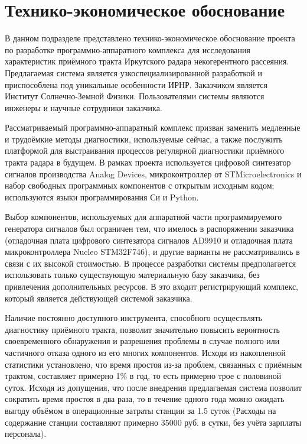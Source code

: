 \documentclass{report}
\begin{document}
\section{Технико-экономическое обоснование}

В данном подразделе представлено технико-экономическое обоснование проекта по разработке программно-аппаратного комплекса для исследования характеристик приёмного тракта Иркутского радара некогерентного рассеяния. Предлагаемая система является узкоспециализированной разработкой и приспособлена под уникальные особенности ИРНР. Заказчиком является Институт Солнечно-Земной Физики. Пользователями системы являются инженеры и научные сотрудники заказчика.

Рассматриваемый программно-аппаратный комплекс призван заменить медленные и трудоёмкие методы диагностики, используемые сейчас, а также послужить платформой для выстраивания процессов регулярной диагностики приёмного тракта радара в будущем. В рамках проекта используется цифровой синтезатор сигналов производства Analog Devices, микроконтроллер от STMicroelectronics и набор свободных программных компонентов с открытым исходным кодом; используются языки программирования Си и Python.

Выбор компонентов, используемых для аппаратной части программируемого генератора сигналов был ограничен тем, что имелось в распоряжении заказчика (отладочная плата цифрового синтезатора сигналов AD9910 и отладочная плата микроконтроллера Nucleo STM32F746), и другие варианты не рассматривались в связи с их высокой стоимостью. В процессе разработки системы предполагается использовать только существующую материальную базу заказчика, без привлечения дополнительных ресурсов. В это входит регистрирующий комплекс, который является действующей системой заказчика.

Наличие постоянно доступного инструмента, способного осуществлять диагностику приёмного тракта, позволит значительно повысить вероятность своевременного обнаружения и разрешения проблемы в случае полного или частичного отказа одного из его многих компонентов. Исходя из накопленной статистики установлено, что время простоя из-за проблем, связанных с приёмным трактом, составляет примерно 1\% в год, то есть примерно трое с половиной суток. Исходя из допущения, что после внедрения предлагаемая система позволит сократить время простоя в два раза, то в течение одного года можно ожидать выгоду объёмом в операционные затраты станции за 1.5 суток (Расходы на содержание станции составляют примерно 35000 руб. в сутки, без учёта зарплаты персонала).
\end{document}
